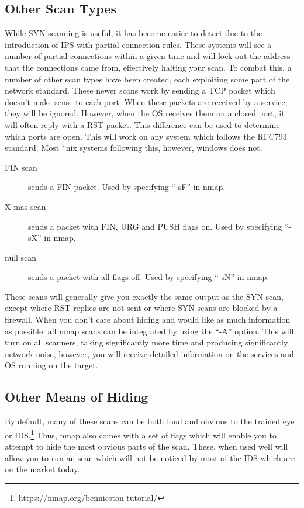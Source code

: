 \documentclass[a4paper,11pt]{report}
\begin{document}
		\subsection{Other Scan Types}
			While SYN scanning is useful, it has become easier to detect due to the introduction of IPS with partial connection rules. 
			These systems will see a number of partial connections within a given time and will lock out the address that the connections came from, effectively halting your scan. 
			To combat this, a number of other scan types have been created, each exploiting some part of the network standard. 
			These newer scans work by sending a TCP packet which doesn't make sense to each port. 
			When these packets are received by a service, they will be ignored. 
			However, when the OS receives them on a closed port, it will often reply with a RST packet. 
			This difference can be used to determine which ports are open. 
			This will work on any system which follows the RFC793 standard. 
			Most *nix systems following this, however, windows does not. 
			\begin{description}
				\item[FIN scan]
					sends a FIN packet. 
					Used by specifying ``-sF'' in nmap. 
				\item[X-mas scan]
					sends a packet with FIN, URG and PUSH flags on.
					Used by specifying ``-sX'' in nmap. 
				\item[null scan]
					sends a packet with all flags off. 
					Used by specifying ``-sN'' in nmap. 
			\end{description}
			These scans will generally give you exactly the same output as the SYN scan, except where RST replies are not sent or where SYN scans are blocked by a firewall. 
			When you don't care about hiding and would like as much information as possible, all nmap scans can be integrated by using the ``-A'' option. 
			This will turn on all scanners, taking significantly more time and producing significantly network noise, however, you will receive detailed information on the services and OS running on the target. 

		\subsection{Other Means of Hiding}
			By default, many of these scans can be both loud and obvious to the trained eye or IDS.\footnote{\url{https://nmap.org/bennieston-tutorial/}} 
			Thus, nmap also comes with a set of flags which will enable you to attempt to hide the most obvious parts of the scan. 
			These, when used well will allow you to run an scan which will not be noticed by most of the IDS which are on the market today. 
\end{document}
